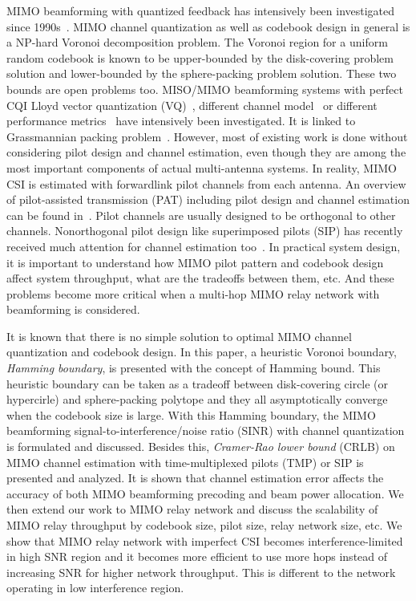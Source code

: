 \documentclass[conference]{IEEEtran}
\begin{document}
MIMO beamforming with quantized feedback has intensively been
investigated since 1990s~\cite{Gerlach94}. MIMO channel
quantization as well as codebook design in general is a NP-hard
Voronoi decomposition problem. The Voronoi region for a uniform
random codebook is known to be upper-bounded by the disk-covering
problem solution and lower-bounded by the sphere-packing problem
solution. These two bounds are open problems too. MISO/MIMO
beamforming systems with perfect CQI Lloyd vector quantization
(VQ)~\cite{Narula98}, different channel model~\cite{Mukka03} or
different performance metrics~\cite{PXia04,Roh04} have intensively
been investigated. It is linked to Grassmannian packing
problem~\cite{Love02}. However, most of existing work is done
without considering pilot design and channel estimation, even
though they are among the most important components of actual
multi-antenna systems. In reality, MIMO CSI is estimated with
forwardlink pilot channels from each antenna. An overview of
pilot-assisted transmission (PAT) including pilot design and
channel estimation can be found in~\cite{Tong04}. Pilot channels
are usually designed to be orthogonal to other channels.
Nonorthogonal pilot design like superimposed pilots (SIP) has
recently received much attention for channel estimation
too~\cite{Coldrey06}. In practical system design, it is important
to understand how MIMO pilot pattern and codebook design affect
system throughput, what are the tradeoffs between them, etc. And
these problems become more critical when a multi-hop MIMO relay
network with beamforming is considered.

It is known that there is no simple solution to optimal MIMO
channel quantization and codebook design. In this paper, a
heuristic Voronoi boundary, {\em Hamming boundary}, is presented
with the concept of Hamming bound. This heuristic boundary can be
taken as a tradeoff between disk-covering circle (or hypercirle)
and sphere-packing polytope and they all asymptotically converge
when the codebook size is large. With this Hamming boundary, the
MIMO beamforming signal-to-interference/noise ratio (SINR) with
channel quantization is formulated and discussed. Besides this,
{\em Cramer-Rao lower bound} (CRLB) on MIMO channel estimation
with time-multiplexed pilots (TMP) or SIP is presented and
analyzed. It is shown that channel estimation error affects the
accuracy of both MIMO beamforming precoding and beam power
allocation. We then extend our work to MIMO relay network and
discuss the scalability of MIMO relay throughput by codebook size,
pilot size, relay network size, etc. We show that MIMO relay
network with imperfect CSI becomes interference-limited in high
SNR region and it becomes more efficient to use more hops instead
of increasing SNR for higher network throughput. This is different
to the network operating in low interference region.
\end{document}

